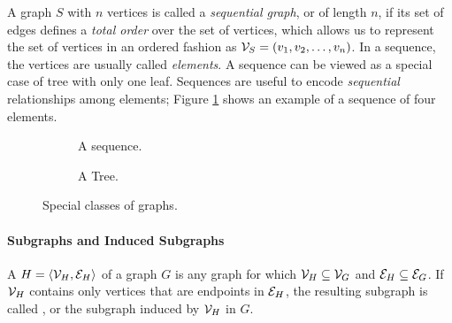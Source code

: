 A graph $S$ with $n$ vertices is called a \emph{sequential graph}, or  of length $n$, if its set of edges defines a \emph{total order} over the set of vertices, which allows us to represent the set of vertices in an ordered fashion as $\Cal{V}_S = (v_1, v_2, \ldots, v_n)$. In a sequence, the vertices are usually called \emph{elements}. A sequence can be viewed as a special case of tree with only one leaf. Sequences are useful to encode \emph{sequential} relationships among elements; Figure \ref{fig:sequence} shows an example of a sequence of four elements. 
\begin{figure*}
    \begin{subfigure}[b]{0.49\linewidth}
        \centering
        \resizebox{.8\textwidth}{!}{}
        \caption{A sequence.}
        \label{fig:sequence}
    \end{subfigure}
    \begin{subfigure}[b]{0.49\linewidth}
        \centering
        \resizebox{.8\textwidth}{!}{}
        \caption{A Tree.}
        \label{fig:tree}
    \end{subfigure}
    \caption{Special classes of graphs.}
\end{figure*}

\paragraph{Subgraphs and Induced Subgraphs} A 
$H = \langle \Cal{V}_H, \Cal{E}_H \rangle$ of a graph $G$ is any graph for which $\Cal{V}_H \subseteq \Cal{V}_G$ and  $\Cal{E}_H \subseteq \Cal{E}_G$. If $\Cal{V}_H$ contains only vertices that are endpoints in $\Cal{E}_H$, the resulting subgraph is called , or the subgraph induced by $\Cal{V}_H$ in $G$. 

